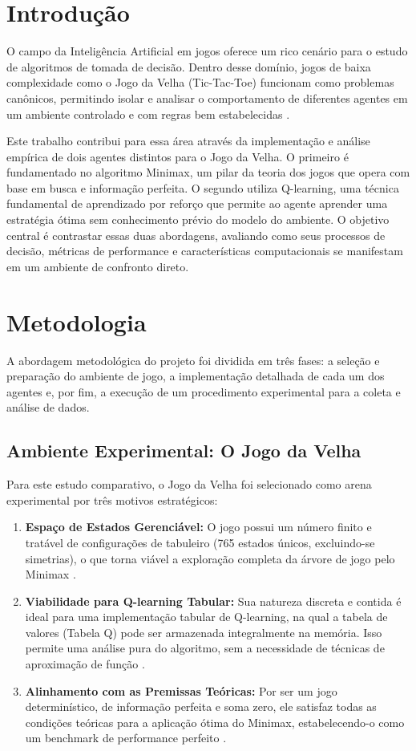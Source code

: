 \documentclass[conference]{IEEEtran}
\begin{document}

\section{Introdução}
O campo da Inteligência Artificial em jogos oferece um rico cenário para o estudo de algoritmos de tomada de decisão. Dentro desse domínio, jogos de baixa complexidade como o Jogo da Velha (Tic-Tac-Toe) funcionam como problemas canônicos, permitindo isolar e analisar o comportamento de diferentes agentes em um ambiente controlado e com regras bem estabelecidas \cite{lermen2021, sutton1998}.

Este trabalho contribui para essa área através da implementação e análise empírica de dois agentes distintos para o Jogo da Velha. O primeiro é fundamentado no algoritmo Minimax, um pilar da teoria dos jogos que opera com base em busca e informação perfeita. O segundo utiliza Q-learning, uma técnica fundamental de aprendizado por reforço que permite ao agente aprender uma estratégia ótima sem conhecimento prévio do modelo do ambiente. O objetivo central é contrastar essas duas abordagens, avaliando como seus processos de decisão, métricas de performance e características computacionais se manifestam em um ambiente de confronto direto.

\section{Metodologia}
A abordagem metodológica do projeto foi dividida em três fases: a seleção e preparação do ambiente de jogo, a implementação detalhada de cada um dos agentes e, por fim, a execução de um procedimento experimental para a coleta e análise de dados.

\subsection{Ambiente Experimental: O Jogo da Velha}
Para este estudo comparativo, o Jogo da Velha foi selecionado como arena experimental por três motivos estratégicos:
\begin{enumerate}
  \item \textbf{Espaço de Estados Gerenciável:} O jogo possui um número finito e tratável de configurações de tabuleiro (765 estados únicos, excluindo-se simetrias), o que torna viável a exploração completa da árvore de jogo pelo Minimax \cite{silva2023}.
  \item \textbf{Viabilidade para Q-learning Tabular:} Sua natureza discreta e contida é ideal para uma implementação tabular de Q-learning, na qual a tabela de valores (Tabela Q) pode ser armazenada integralmente na memória. Isso permite uma análise pura do algoritmo, sem a necessidade de técnicas de aproximação de função \cite{lermen2021}.
  \item \textbf{Alinhamento com as Premissas Teóricas:} Por ser um jogo determinístico, de informação perfeita e soma zero, ele satisfaz todas as condições teóricas para a aplicação ótima do Minimax, estabelecendo-o como um benchmark de performance perfeito \cite{sutton1998}.
\end{enumerate}
\end{document}
